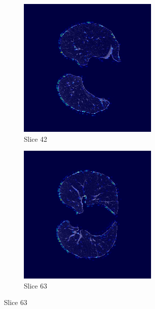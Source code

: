 
\begin{figure}[!htbp]
\centering
\begin{subfigure}[b]{0.45\textwidth}
    \includegraphics[width=\textwidth]{img/label0_fallo_pred1_pid32HENX_slice_42.png}
    \caption{Slice 42}
\end{subfigure}
\hfill
\begin{subfigure}[b]{0.45\textwidth}
    \includegraphics[width=\textwidth]{img/label0_fallo_pred1_pid32HENX_slice_63.png}
    \caption{Slice 63}
\end{subfigure}


\end{figure}
